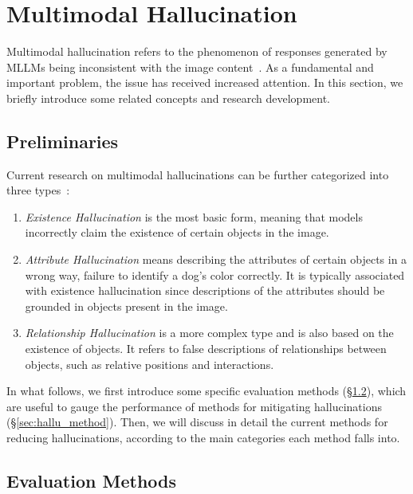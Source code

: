 \section{Multimodal Hallucination}
\label{sec:hallu}
Multimodal hallucination refers to the phenomenon of responses generated by MLLMs being inconsistent with the image content~\cite{yin2023woodpecker}. As a fundamental and important problem, the issue has received increased attention. In this section, we briefly introduce some related concepts and research development.

\subsection{Preliminaries}
\label{sec:hallu_prelim}
Current research on multimodal hallucinations can be further categorized into three types~\cite{zhai2023halle}:
\begin{enumerate}
    \item \textit{Existence Hallucination} is the most basic form, meaning that models incorrectly claim the existence of certain objects in the image.
    \item \textit{Attribute Hallucination} means describing the attributes of certain objects in a wrong way, \eg failure to identify a dog's color correctly. It is typically associated with existence hallucination since descriptions of the attributes should be grounded in objects present in the image.
    \item \textit{Relationship Hallucination} is a more complex type and is also based on the existence of objects. It refers to false descriptions of relationships between objects, such as relative positions and interactions.   
\end{enumerate}

In what follows, we first introduce some specific evaluation methods (\S \ref{sec:hallu_eval_method}), which are useful to gauge the performance of methods for mitigating hallucinations (\S \ref{sec:hallu_method}). Then, we will discuss in detail the current methods for reducing hallucinations, according to the main categories each method falls into.

\subsection{Evaluation Methods}
\label{sec:hallu_eval_method}

